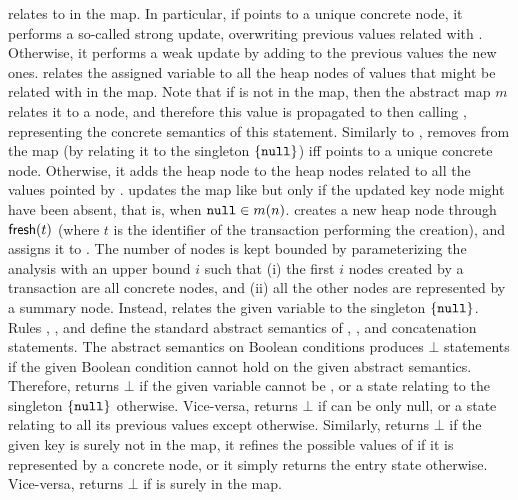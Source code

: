 relates  to  in the map. In particular, if  points to a unique concrete node, it performs a so-called strong update, overwriting previous values related with . Otherwise, it performs a weak update by adding to the previous values the new ones.  relates the assigned variable  to all the heap nodes of values that might be related with  in the map. Note that if  is not in the map, then the abstract map $m$ relates it to a  node, and therefore this value is propagated to  then calling , representing the concrete semantics of this statement. Similarly to ,  removes  from the map (by relating it to the singleton $\{\mathtt{null}\}$) iff  points to a unique concrete node. Otherwise, it adds the heap node  to the heap nodes related to all the values pointed by .  updates the map like  but only if the updated key node might have been absent, that is, when $\mathtt{null} \in m(n)$.  creates a new heap node through $\mathsf{fresh}(t)$ (where $t$ is the identifier of the transaction performing the creation), and assigns it to . The number of nodes is kept bounded by parameterizing the analysis with an upper bound $i$ such that (i) the first $i$ nodes created by a transaction are all concrete nodes, and (ii) all the other nodes are represented by a summary node. Instead,  relates the given variable to the singleton $\{\mathtt{null}\}$.
Rules , , and  define the standard abstract semantics of , , and concatenation statements.
The abstract semantics on Boolean conditions produces $\bot$ statements if the given Boolean condition cannot hold on the given abstract semantics. Therefore,  returns $\bot$ if the given variable  cannot be , or a state relating  to the singleton $\{\mathtt{null}\}$ otherwise. Vice-versa,  returns $\bot$ if  can be only null, or a state relating  to all its previous values except  otherwise.
Similarly,  returns $\bot$ if the given key  is surely not in the map, it refines the possible values of  if it is represented by a concrete node, or it simply returns the entry state otherwise. Vice-versa,  returns $\bot$ if  is surely in the map.

